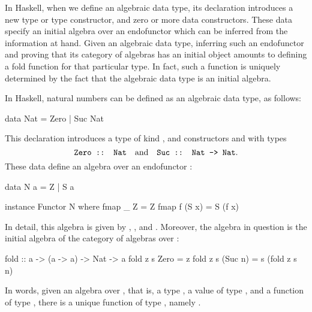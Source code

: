 In Haskell, when we define an algebraic data type, its declaration
introduces a new type or type constructor, and zero or more data
constructors. These data specify an initial algebra over an
endofunctor which can be inferred from the information at hand. Given
an algebraic data type, inferring such an endofunctor and proving that
its category of algebras has an initial object amounts to defining a
fold function for that particular type. In fact, such a function is
uniquely determined by the fact that the algebraic data type is an
initial algebra.

\begin{example}
  \label{ex:algebra-natural-haskell}


  In Haskell, natural numbers can be defined as an algebraic data
  type, as follows:
  \begin{codehaskell}
data Nat = Zero | Suc Nat
  \end{codehaskell}
  This declaration introduces a type  of kind
  \texthaskell{*}, and constructors  and
   with types
  \begin{equation*}
    \text{\texttt{Zero :: Nat}}
    \quad
    \text{and}
    \quad
    \text{\texttt{Suc :: Nat -> Nat}}
    \text{.}
  \end{equation*}
  These data define an algebra over an endofunctor :
  \begin{codehaskell}
data N a = Z | S a

instance Functor N where
  fmap _ Z     = Z
  fmap f (S x) = S (f x)
\end{codehaskell}
  In detail, this algebra is given by ,
  , and . Moreover, the algebra in
  question is the initial algebra of the category of algebras over
  :
  \begin{codehaskell}
fold :: a -> (a -> a) -> Nat -> a
fold z s Zero    = z
fold z s (Suc n) = s (fold z s n)
  \end{codehaskell}
  In words, given an algebra over , that is, a type
  , a value  of type ,
  and a function  of type , there
  is a unique function of type , namely
  .


\end{example}
